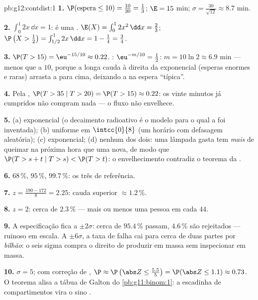 \begin{solution}{pb:g12:contdist:1}
\textbf{1.} $\P(\text{espera} \leq 10) = \frac{10}{30} =
\frac13$; $\E = 15$ min;
$\sigma = \frac{30}{\sqrt{12}} \approx 8.7$ min.

\textbf{2.} $\int_0^1 2x\,\dd x = 1$: é uma .
$\E(X) = \int_0^1 2x^2\,\dd x = \frac23$;
$\P\left(X > \frac12\right) = \int_{1/2}^1 2x\,\dd x =
1 - \frac14 = \frac34$.

\textbf{3.} $\P(T > 15) = \eu^{-15/10} \approx 0.22$.
: $\eu^{-m/10} = \frac12$: $m = 10\ln 2 \approx 6.9$
min --- menos que a  $10$, porque a longa cauda à direita
da exponencial (esperas enormes e raras) arrasta a  para
cima, deixando a  na espera ``típica''.

\textbf{4.} Pela ,
$\P(T > 35 \mid T > 20) = \P(T > 15) \approx 0.22$: os vinte
minutos já cumpridos não compram nada --- o fluxo não
envelhece.

\textbf{5.} (a) exponencial (o decaimento radioativo é o
modelo para o qual a  foi inventada); (b)
uniforme em $\intcc{0}{8}$ (um horário com defasagem
aleatória); (c) exponencial; (d) nenhum dos dois: uma lâmpada
gasta tem \emph{mais}  de queimar na próxima hora
que uma nova, de modo que
$\P(T > s + t \mid T > s) < \P(T > t)$: o envelhecimento
contradiz o teorema da .

\textbf{6.} $68\,\%$, $95\,\%$, $99.7\,\%$: os três
 de referência.

\textbf{7.} $z = \frac{190 - 172}{8} = 2.25$: cauda superior
$\approx 1.2\,\%$.

\textbf{8.} $z = 2$: cerca de $2.3\,\%$ --- mais ou menos uma
pessoa em cada $44$.

\textbf{9.} A especificação fica a $\pm 2\sigma$: cerca de
$95.4\,\%$ passam, $4.6\,\%$ são rejeitados --- ruinoso em
escala. A $\pm 6\sigma$, a taxa de falha cai para cerca de
duas partes por \emph{bilhão}: o seis sigma compra o direito
de produzir em massa sem inspecionar em massa.

\textbf{10.} $\sigma = 5$; com correção de ,
$\P \approx \P\left(\abs Z \leq \frac{5.5}{5}\right) =
\P(\abs Z \leq 1.1) \approx 0.73$. O teorema alisa a tábua de
Galton do \cref{pb:g11:binom:1}: a escadinha de compartimentos
vira o sino .


\end{solution}
